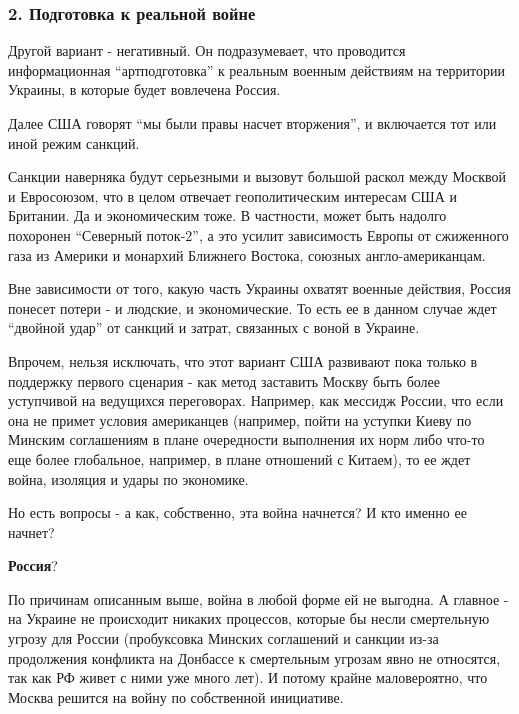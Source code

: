  
 
 
 
 

\subsubsection{2. Подготовка к реальной войне}
\label{sec:12_02_2022.stz.news.ua.strana.1.vojna_nachnetsja_15_fevralja.5.two}

Другой вариант - негативный. Он подразумевает, что проводится информационная
\enquote{артподготовка} к реальным военным действиям на территории Украины, в которые
будет вовлечена Россия. 

Далее США говорят \enquote{мы были правы насчет вторжения}, и включается тот или иной
режим санкций.

Санкции наверняка будут серьезными и вызовут большой раскол между Москвой и
Евросоюзом, что в целом отвечает геополитическим интересам США и Британии. Да и
экономическим тоже. В частности, может быть надолго похоронен \enquote{Северный
поток-2}, а это усилит зависимость Европы от сжиженного газа из Америки и
монархий Ближнего Востока, союзных англо-американцам. 

Вне зависимости от того, какую часть Украины охватят военные действия, Россия
понесет потери - и людские, и экономические. То есть ее в данном случае ждет
\enquote{двойной удар} от санкций и затрат, связанных с воной в Украине. 

Впрочем, нельзя исключать, что этот вариант США развивают пока только в
поддержку первого сценария - как метод заставить Москву быть более уступчивой
на ведущихся переговорах. Например, как мессидж России, что если она не примет
условия американцев (например, пойти на уступки Киеву по Минским соглашениям в
плане очередности выполнения их норм либо что-то еще более глобальное,
например, в плане отношений с Китаем), то ее ждет война, изоляция и удары по
экономике.

Но есть вопросы - а как, собственно, эта война начнется? И кто именно ее
начнет?

\textbf{Россия}? 

По причинам описанным выше, война в любой форме ей не выгодна. А главное - на
Украине не происходит никаких процессов, которые бы несли смертельную угрозу
для России (пробуксовка Минских соглашений и санкции из-за продолжения
конфликта на Донбассе к смертельным угрозам явно не относятся, так как РФ живет
с ними уже много лет). И потому крайне маловероятно, что Москва решится на
войну по собственной инициативе.


